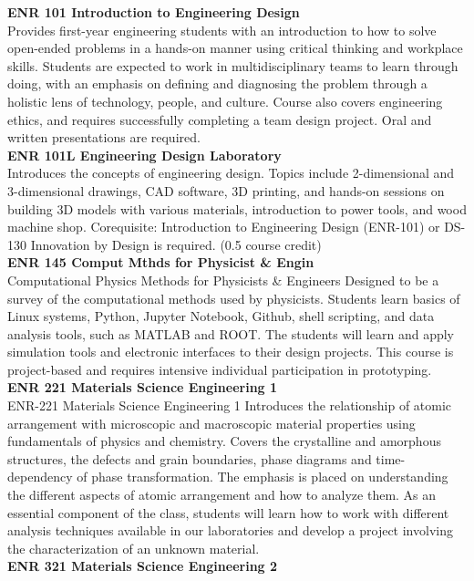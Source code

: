 \documentclass[
  letterpaper,
]{scrbook}
\begin{document}
\textbf{ENR 101 Introduction to Engineering Design}\\
Provides first-year engineering students with an introduction to how to
solve open-ended problems in a hands-on manner using critical thinking
and workplace skills. Students are expected to work in multidisciplinary
teams to learn through doing, with an emphasis on defining and
diagnosing the problem through a holistic lens of technology, people,
and culture. Course also covers engineering ethics, and requires
successfully completing a team design project. Oral and written
presentations are required.\\
\textbf{ENR 101L Engineering Design Laboratory}\\
Introduces the concepts of engineering design. Topics include
2-dimensional and 3-dimensional drawings, CAD software, 3D printing, and
hands-on sessions on building 3D models with various materials,
introduction to power tools, and wood machine shop. Corequisite:
Introduction to Engineering Design (ENR-101) or DS-130 Innovation by
Design is required. (0.5 course credit)\\
\textbf{ENR 145 Comput Mthds for Physicist \& Engin}\\
Computational Physics Methods for Physicists \& Engineers Designed to be
a survey of the computational methods used by physicists. Students learn
basics of Linux systems, Python, Jupyter Notebook, Github, shell
scripting, and data analysis tools, such as MATLAB and ROOT. The
students will learn and apply simulation tools and electronic interfaces
to their design projects. This course is project-based and requires
intensive individual participation in prototyping.\\
\textbf{ENR 221 Materials Science Engineering 1}\\
ENR-221 Materials Science Engineering 1 Introduces the relationship of
atomic arrangement with microscopic and macroscopic material properties
using fundamentals of physics and chemistry. Covers the crystalline and
amorphous structures, the defects and grain boundaries, phase diagrams
and time-dependency of phase transformation. The emphasis is placed on
understanding the different aspects of atomic arrangement and how to
analyze them. As an essential component of the class, students will
learn how to work with different analysis techniques available in our
laboratories and develop a project involving the characterization of an
unknown material.\\
\textbf{ENR 321 Materials Science Engineering 2}\\
\end{document}

